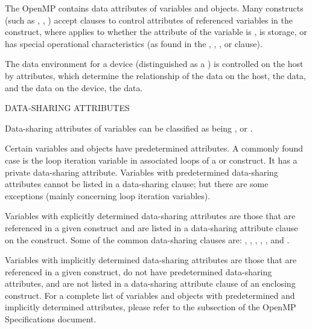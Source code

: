\label{chap:data_environment}
The OpenMP  contains data attributes of variables and
objects.  Many constructs (such as , , ) 
accept clauses to control  attributes
of referenced variables in the construct, where  applies to
whether the attribute of the variable is , 
is  storage, or has special operational characteristics 
(as found in the , , , or  clause).

The data environment for a device (distinguished as a )
is controlled on the host by  attributes, which determine the
relationship of the data on the host, the  data, and the data on the
device, the  data.

\bigskip
DATA-SHARING ATTRIBUTES

Data-sharing attributes of variables can be classified as being ,
 or .

Certain variables and objects have predetermined attributes.  
A commonly found case is the loop iteration variable in associated loops 
of a  or  construct. It has a private data-sharing attribute.
Variables with predetermined data-sharing attributes cannot be listed in a data-sharing clause; but there are some
exceptions (mainly concerning loop iteration variables).

Variables with explicitly determined data-sharing attributes are those that are
referenced in a given construct and are listed in a data-sharing attribute
clause on the construct. Some of the common data-sharing clauses are:
, , , , 
, and . %

Variables with implicitly determined data-sharing attributes are those
that are referenced in a given construct, do not have predetermined
data-sharing attributes, and are not listed in a data-sharing
attribute clause of an enclosing construct.
For a complete list of variables and objects with predetermined and
implicitly determined attributes, please refer to the
subsection of the OpenMP Specifications document.  

